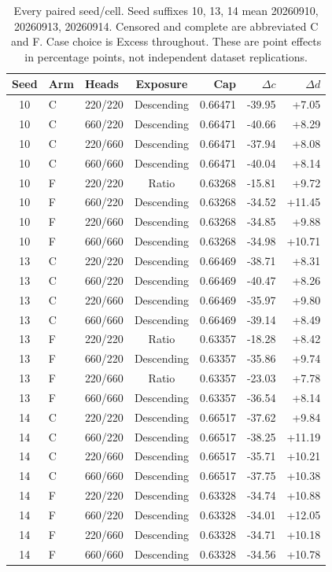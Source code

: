 \begin{table}[H]\centering\small
\caption{Every paired seed/cell. Seed suffixes 10, 13, 14 mean 20260910, 20260913, 20260914. Censored and complete are abbreviated C and F. Case choice is Excess throughout. These are point effects in percentage points, not independent dataset replications.}\label{tab:seed-v12-all}
\begin{tabular}{cllcrrr}\toprule
Seed & Arm & Heads & Exposure & Cap & $\Delta c$ & $\Delta d$\\\midrule
10 & C & 220/220 & Descending & 0.66471 & -39.95 & +7.05 \\
10 & C & 660/220 & Descending & 0.66471 & -40.66 & +8.29 \\
10 & C & 220/660 & Descending & 0.66471 & -37.94 & +8.08 \\
10 & C & 660/660 & Descending & 0.66471 & -40.04 & +8.14 \\
10 & F & 220/220 & Ratio & 0.63268 & -15.81 & +9.72 \\
10 & F & 660/220 & Descending & 0.63268 & -34.52 & +11.45 \\
10 & F & 220/660 & Descending & 0.63268 & -34.85 & +9.88 \\
10 & F & 660/660 & Descending & 0.63268 & -34.98 & +10.71 \\
13 & C & 220/220 & Descending & 0.66469 & -38.71 & +8.31 \\
13 & C & 660/220 & Descending & 0.66469 & -40.47 & +8.26 \\
13 & C & 220/660 & Descending & 0.66469 & -35.97 & +9.80 \\
13 & C & 660/660 & Descending & 0.66469 & -39.14 & +8.49 \\
13 & F & 220/220 & Ratio & 0.63357 & -18.28 & +8.42 \\
13 & F & 660/220 & Descending & 0.63357 & -35.86 & +9.74 \\
13 & F & 220/660 & Ratio & 0.63357 & -23.03 & +7.78 \\
13 & F & 660/660 & Descending & 0.63357 & -36.54 & +8.14 \\
14 & C & 220/220 & Descending & 0.66517 & -37.62 & +9.84 \\
14 & C & 660/220 & Descending & 0.66517 & -38.25 & +11.19 \\
14 & C & 220/660 & Descending & 0.66517 & -35.71 & +10.21 \\
14 & C & 660/660 & Descending & 0.66517 & -37.75 & +10.38 \\
14 & F & 220/220 & Descending & 0.63328 & -34.74 & +10.88 \\
14 & F & 660/220 & Descending & 0.63328 & -34.01 & +12.05 \\
14 & F & 220/660 & Descending & 0.63328 & -34.71 & +10.18 \\
14 & F & 660/660 & Descending & 0.63328 & -34.56 & +10.78 \\
\bottomrule\end{tabular}\end{table}

